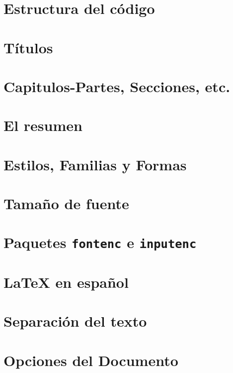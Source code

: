 \documentclass[12pt,aspectratio=43]{beamer}
\newcommand{\lmr}{\fontfamily{lmr}\selectfont}
\begin{document}
\section{Estructura del código}

\section{Títulos}

\section{Capitulos-Partes, Secciones, etc.}

\section{El resumen}

\section{Estilos, Familias y Formas}

\section{Tamaño de fuente}

\section{Paquetes {\tt fontenc} e {\tt inputenc}}

\section {{\lmr\LaTeX} en español}

\section{Separación del texto}

\section{Opciones del Documento}
\end{document}
